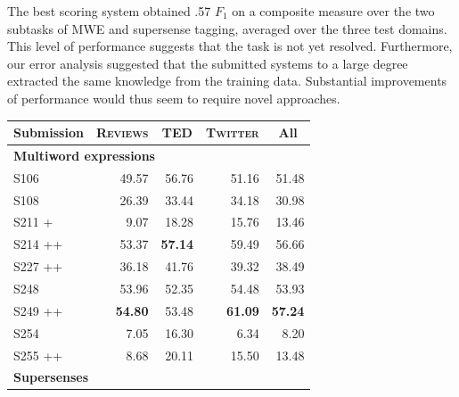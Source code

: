 \documentclass[11pt,letterpaper]{article}
\newcommand{\ensuretext}[1]{#1}
\newcommand{\nssmarker}{\ensuretext{\textcolor{magenta}{\ensuremath{^{\textsc{NS}}_{\textsc{S}}}}}}
\newcommand{\arkcomment}[3]{\ensuretext{\textcolor{#3}{[#1 #2]}}}
\newcommand{\nss}[1]{\arkcomment{\nssmarker}{#1}{magenta}}
\newcommand{\dataset}[1]{\mbox{\textsc{#1}}}	%
\newcommand{\finalversion}[1]{}
\begin{document}
The best scoring system obtained .57 $F_1$ on a composite measure over the two subtasks of MWE and supersense tagging, 
averaged over the three test domains. This level of performance suggests that the task is not yet resolved. 
Furthermore, our error analysis suggested that the submitted systems to a large degree 
extracted the same knowledge from the training data. 
Substantial improvements of performance would thus seem to require novel approaches. 

\finalversion{
\section*{Acknowledgments}
\nss{Sam (annotator), funding}}

\begin{table}\small\centering
\begin{tabular}{lr<{\hspace{10pt}}rr<{\hspace{10pt}}r}
\textbf{Submission} &  \multicolumn{1}{c}{\textbf{\dataset{Reviews}}} &   \multicolumn{1}{c}{\textbf{\dataset{TED}}} 
   &  \multicolumn{1}{c}{\textbf{\dataset{Twitter}}} &  \multicolumn{1}{c}{\textbf{All}} \\
\midrule
\multicolumn{5}{l}{\textbf{Multiword expressions}} \\

S106       &   49.57 &  56.76 &   51.16 &      51.48 \\
S108       &   26.39 &  33.44 &   34.18 &      30.98 \\
S211 +     &    9.07 &  18.28 &   15.76 &      13.46 \\
S214 ++    &   53.37 &  \textbf{57.14} &   59.49 &      56.66 \\
S227 ++    &   36.18 &  41.76 &   39.32 &      38.49 \\
S248       &   53.96 &  52.35 &   54.48 &      53.93 \\
S249 ++    &   \textbf{54.80} &  53.48 &   \textbf{61.09} &      \textbf{57.24} \\
S254       &    7.05 &  16.30 &    6.34 &       8.20 \\
S255 ++    &    8.68 &  20.11 &   15.50 &      13.48 \\[1.4ex]

\multicolumn{5}{l}{\textbf{Supersenses}} \\


\end{tabular}
\end{table}
\end{document}
